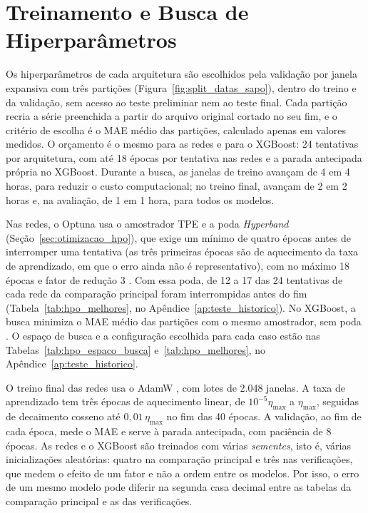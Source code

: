 \section{Treinamento e Busca de Hiperparâmetros}
\label{sec:treinamento_hpo}

Os hiperparâmetros de cada arquitetura são escolhidos pela validação por janela expansiva com três partições (Figura~\ref{fig:split_datas_sapo}), dentro do treino e da validação, sem acesso ao teste preliminar nem ao teste final. Cada partição recria a série preenchida a partir do arquivo original cortado no seu fim, e o critério de escolha é o MAE médio das partições, calculado apenas em valores medidos. O orçamento é o mesmo para as redes e para o XGBoost: 24 tentativas por arquitetura, com até 18 épocas por tentativa nas redes e a parada antecipada própria no XGBoost. Durante a busca, as janelas de treino avançam de 4 em 4 horas, para reduzir o custo computacional; no treino final, avançam de 2 em 2 horas e, na avaliação, de 1 em 1 hora, para todos os modelos.

Nas redes, o Optuna usa o amostrador TPE e a poda \textit{Hyperband} (Seção~\ref{sec:otimizacao_hpo}), que exige um mínimo de quatro épocas antes de interromper uma tentativa (as três primeiras épocas são de aquecimento da taxa de aprendizado, em que o erro ainda não é representativo), com no máximo 18 épocas e fator de redução 3 \cite{akiba2019optuna,li2018hyperband}. Com essa poda, de 12 a 17 das 24 tentativas de cada rede da comparação principal foram interrompidas antes do fim (Tabela~\ref{tab:hpo_melhores}, no Apêndice~\ref{ap:teste_historico}). No XGBoost, a busca minimiza o MAE médio das partições com o mesmo amostrador, sem poda \cite{chen2016xgboost}. O espaço de busca e a configuração escolhida para cada caso estão nas Tabelas~\ref{tab:hpo_espaco_busca} e~\ref{tab:hpo_melhores}, no Apêndice~\ref{ap:teste_historico}.


O treino final das redes usa o AdamW \cite{loshchilov2019decoupled}, com lotes de 2.048 janelas. A taxa de aprendizado tem três épocas de aquecimento linear, de \(10^{-5}\eta_{\max}\) a \(\eta_{\max}\), seguidas de decaimento cosseno até \(0{,}01\,\eta_{\max}\) no fim das 40 épocas. A validação, ao fim de cada época, mede o MAE e serve à parada antecipada, com paciência de 8 épocas. As redes e o XGBoost são treinados com várias \emph{sementes}, isto é, várias inicializações aleatórias: quatro na comparação principal e três nas verificações, que medem o efeito de um fator e não a ordem entre os modelos. Por isso, o erro de um mesmo modelo pode diferir na segunda casa decimal entre as tabelas da comparação principal e as das verificações.

